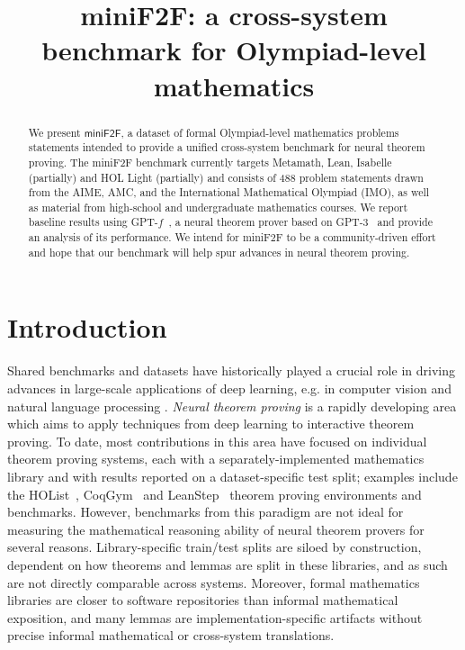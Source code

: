\title{miniF2F: a cross-system benchmark for Olympiad-level mathematics}

\begin{abstract}
We present $\textsf{miniF2F}$, a dataset of formal Olympiad-level mathematics problems statements intended to provide a unified cross-system benchmark for neural theorem proving. The \textsf{miniF2F} benchmark currently targets Metamath, Lean, Isabelle (partially) and HOL Light (partially) and consists of 488 problem statements drawn from the AIME, AMC, and the International Mathematical Olympiad (IMO), as well as material from high-school and undergraduate mathematics courses. We report baseline results using GPT-$f$~\citep{polu2020generative}, a neural theorem prover based on GPT-3~\citep{brown2020language} and provide an analysis of its performance. We intend for \textsf{miniF2F} to be a community-driven effort and hope that our benchmark will help spur advances in neural theorem proving.
\end{abstract}

\section{Introduction}

Shared benchmarks and datasets have historically played a crucial role in driving advances in large-scale applications of deep learning, e.g. in computer vision \citep{deng2009imagenet} and natural language processing
\citep{DBLP:conf/iclr/WangSMHLB19, DBLP:conf/emnlp/RajpurkarZLL16, DBLP:conf/acl/PapernoKLPBPBBF16}. \emph{Neural theorem proving} is a rapidly developing area which aims to apply techniques from deep learning to interactive theorem proving. To date, most contributions in this area have focused on individual theorem proving systems, each with a separately-implemented mathematics library and with results reported on a dataset-specific test split; examples include the HOList~\citep{bansal2019holist}, CoqGym~\citep{yang2019learning} and LeanStep~\citep{han2021proof} theorem proving environments and benchmarks. However, benchmarks from this paradigm are not ideal for measuring the mathematical reasoning ability of neural theorem provers for several reasons. Library-specific train/test splits are siloed by construction, dependent on how theorems and lemmas are split in these libraries, and as such are not directly comparable across systems. Moreover, formal mathematics libraries are closer to software repositories than informal mathematical exposition, and many lemmas are implementation-specific artifacts without precise informal mathematical or cross-system translations.

